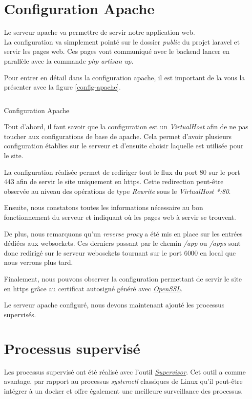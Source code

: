 \documentclass[
    iai, %
    il, %
]{heig-tb}
\begin{document}
\section{Configuration Apache}
Le serveur \Gls{apache} va permettre de servir notre application web. \\
La configuration va simplement pointé sur le dossier \emph{public} du projet \Gls{laravel} et servir les pages web. Ces pages vont communiqué avec le \Gls{backend} lancer en parallèle avec la commande \emph{php artisan up}.

Pour entrer en détail dans la configuration \Gls{apache}, il est important de la vous la présenter avec la figure \ref{config-apache}.

\begin{listing}[h]
    \inputminted{conf}{assets/code/config-apache.conf}
    \caption{Configuration Apache \label{config-apache}}
\end{listing}

Tout d'abord, il faut savoir que la configuration est un \emph{VirtualHost} afin de ne pas toucher aux configurations de base de \Gls{apache}. Cela permet d'avoir plusieurs configuration établies sur le serveur et d'ensuite choisir laquelle est utilisée pour le site.

La configuration réalisée permet de rediriger tout le flux du port 80 sur le port 443 afin de servir le site uniquement en \Gls{https}. Cette redirection peut-être observée au niveau des opérations de type \emph{Rewrite} sous le \emph{VirtualHost *:80}.

Ensuite, nous constatons toutes les informations nécessaire au bon fonctionnement du serveur et indiquant où les pages web à servir se trouvent.

De plus, nous remarquons qu'un \emph{reverse proxy} a été mis en place sur les entrées dédiées aux \Gls{websockets}. Ces derniers passant par le chemin \emph{/app} ou \emph{/apps} sont donc redirigé sur le serveur webosckets tournant sur le port 6000 en local que nous verrons plus tard.

Finalement, nous pouvons observer la configuration permettant de servir le site en  \Gls{https} grâce au certificat autosigné généré avec \href{https://www.openssl.org/}{\emph{OpenSSL}}.

Le serveur \Gls{apache} configuré, nous devons maintenant ajouté les processus supervisés.

\section{Processus supervisé}
Les processus supervisé ont été réalisé avec l'outil \href{http://supervisord.org/}{\emph{Supervisor}}. Cet outil a comme avantage, par rapport au processus \emph{systemctl} classiques de Linux qu'il peut-être intégrer à un \Gls{docker} et offre également une meilleure surveillance des processus.
\end{document}
